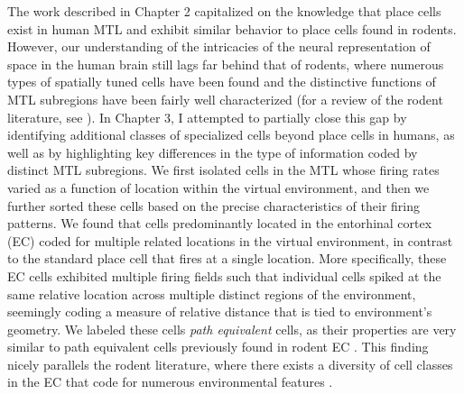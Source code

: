 The work described in Chapter 2 capitalized on the knowledge that place cells exist in human MTL and exhibit similar behavior to place cells found in rodents. However, our understanding of the intricacies of the neural representation of space in the human brain still lags far behind that of rodents, where numerous types of spatially tuned cells have been found and the distinctive functions of MTL subregions have been fairly well characterized (for a review of the rodent literature, see \cite{MoseEtal08}). In Chapter 3, I attempted to partially close this gap by identifying additional classes of specialized cells beyond place cells in humans, as well as by highlighting key differences in the type of information coded by distinct MTL subregions. We first isolated cells in the MTL whose firing rates varied as a function of location within the virtual environment, and then we further sorted these cells based on the precise characteristics of their firing patterns. We found that cells predominantly located in the entorhinal cortex (EC) coded for multiple related locations in the virtual environment, in contrast to the standard place cell that  fires at a single location. More specifically, these EC cells exhibited multiple firing fields such that individual cells spiked at the same relative location across multiple distinct regions of the environment, seemingly coding a measure of relative distance that is tied to environment's geometry. We labeled these cells \textit{path equivalent} cells, as their properties are very similar to path equivalent cells previously found in rodent EC \citep{FranEtal00}. This finding nicely parallels the rodent literature, where there exists a diversity of cell classes in the EC that code for numerous environmental features \citep{HaftEtal05,FyhnEtal04,DerdEtal09,SargEtal06,SolsEtal08}.

